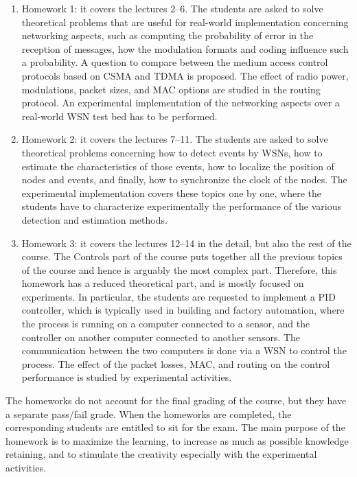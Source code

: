 \documentclass[onecolumn,12pt,draftclsnofoot,a4paper,peerreview]{IEEEtran}
\begin{document}
\begin{enumerate}
\item Homework 1: it covers the lectures 2--6. The students are asked to solve theoretical problems that are useful for real-world implementation concerning networking aspects, such as computing the probability of error in the reception of messages, how the modulation formats and coding influence such a probability. A question to compare between the medium access control protocols based on CSMA and TDMA is proposed. The effect of radio power, modulations, packet sizes, and MAC options are studied in the routing protocol. An experimental implementation of the networking aspects over a real-world WSN test bed has to be performed. 
\item Homework 2: it covers the lectures 7--11. The students are asked to solve theoretical problems concerning how to detect events by WSNs, how to estimate the characteristics of those events, how to localize the position of nodes and events, and finally, how to synchronize the clock of the nodes. The experimental implementation covers these topics one by one, where the students have to characterize experimentally the performance of the various detection and estimation methods. 
\item Homework 3: it covers the lectures 12--14 in the detail, but also the rest of the course. The Controls part of the course puts together all the previous topics of the course and hence is arguably the most complex part. Therefore, this homework has a reduced theoretical part, and is mostly focused on experiments. In particular, the students are requested to implement a PID controller, which is typically used in building and factory automation, where the process is running on a computer connected to a sensor, and the controller on another computer connected to another sensors. The communication between the two computers is done via a WSN to control the process. The effect of the packet losses, MAC, and routing on the control performance is studied by experimental activities. 
\end{enumerate}

The homeworks do not account for the final grading of the course, but they have a separate pass/fail grade. When the homeworks are completed, the corresponding students are entitled to sit for the exam. The main purpose of the homework is to maximize the learning, to increase as much as possible knowledge retaining, and to stimulate the creativity especially with the experimental activities. 
\end{document}

